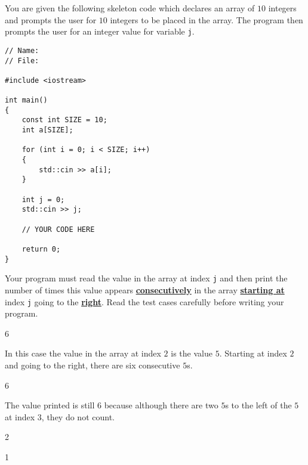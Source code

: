 You are given the following skeleton code which declares an array of $10$
integers and prompts the user for $10$ integers to be placed in the array. The
program then prompts the user for an integer value for variable \verb!j!.

\begin{Verbatim}[frame=single]
// Name:
// File:

#include <iostream>

int main()
{
    const int SIZE = 10;
    int a[SIZE];

    for (int i = 0; i < SIZE; i++)
    {
        std::cin >> a[i];
    }

    int j = 0;
    std::cin >> j;

    // YOUR CODE HERE

    return 0;
}
\end{Verbatim}

Your program must read the value in the array at index \verb!j! and then print
the number of times this value appears \underline{\bf consecutively} in the
array \underline{\bf starting at} index \verb!j! going to the
\underline{\bf right}. Read the test cases carefully before writing your
program.

\resett
\nextt
\begin{console}[frame=single, commandchars=\\\{\}]
6
\end{console}

In this case the value in the array at index $2$ is the value $5$. Starting at
index $2$ and going to the right, there are six consecutive $5$s.

\nextt
\begin{console}[frame=single, commandchars=\\\{\}]
6
\end{console}

The value printed is still $6$ because although there are two $5$s to the left
of the $5$ at index $3$, they do not count.

\nextt
\begin{console}[frame=single, commandchars=\\\{\}]
2
\end{console}

\nextt
\begin{console}[frame=single, commandchars=\\\{\}]
1
\end{console}
